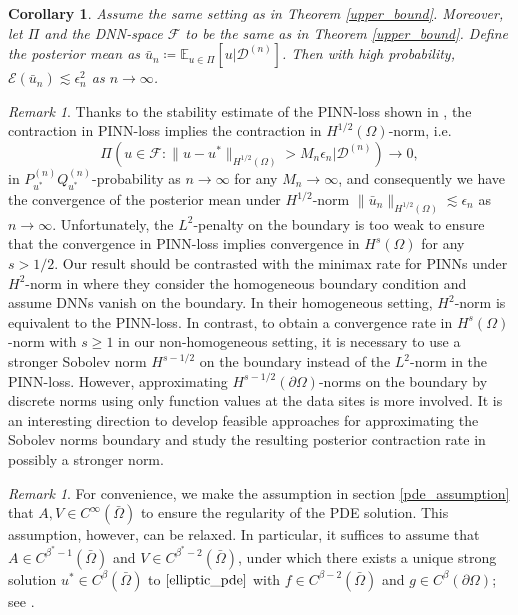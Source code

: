 \documentclass{article}
\newcommand{\E}{\mathbb{E}}
\newcommand{\F}{\mathcal{F}}
\newcommand{\D}{\mathcal{D}}
\theoremstyle{plain}
\newtheorem{corollary}[theorem]{Corollary}
\theoremstyle{definition}
\theoremstyle{remark}
\newtheorem{remark}[theorem]{Remark}
\begin{document}
\begin{corollary} \label{upper_bound_posterior_mean}
    Assume the same setting as in Theorem \ref{upper_bound}. Moreover, let $\Pi$ and the DNN-space $\F$ to be the same as in Theorem \ref{upper_bound}. Define the posterior mean as $\bar{u}_n \coloneqq \E_{u \in \Pi} \left[u | \D^{(n)}\right]$. Then with high probability,  $\mathcal{E}(\bar{u}_n)  \lesssim \epsilon_n^2$ as $n \rightarrow \infty$. 
    
\end{corollary}

\begin{remark} \label{rem:boundary}
    Thanks to the stability estimate of the PINN-loss shown in  \citep[Theorem 8]{zeinhofer2022notes}, the contraction in PINN-loss implies the contraction in $H^{1/2}(\Omega)$-norm, i.e.
    \begin{equation*}
         \Pi(u \in \F: \|u-u^*\|_{H^{1/2}(\Omega)} > M_n \epsilon_n | \D^{(n)}) \to 0,
     \end{equation*}
     in $P_{u^*}^{(n)} Q_{u^*}^{(n)}$-probability as $n \to \infty$ for any $M_n \to \infty$, and consequently we have the convergence of the posterior mean under $H^{1/2}$-norm $\|\bar{u}_n\|_{H^{1/2}(\Omega)} \lesssim \epsilon_n$ as $n\rightarrow \infty$.  Unfortunately,  the $L^2$-penalty on the boundary is too weak to ensure that the convergence in PINN-loss implies convergence in $H^{s}(\Omega)$ for any $s > {1/2}$. Our result should be contrasted with the minimax rate for PINNs under $H^2$-norm in \cite{lu2021machine} where they consider the homogeneous boundary condition and assume DNNs vanish on the boundary. In their homogeneous setting, $H^2$-norm is equivalent to the PINN-loss. In contrast, 
     to obtain a convergence  rate in $H^s(\Omega)$-norm with $s\geq 1$ in our non-homogeneous setting, it is necessary to use a stronger  Sobolev norm $H^{s-1/2}$ on the boundary instead of the $L^2$-norm in the PINN-loss. However, approximating  $H^{s-1/2} (\partial \Omega)$-norms on the boundary by discrete norms  using only function values 
at the data sites is more involved. It is an interesting direction to develop feasible approaches for approximating the Sobolev norms boundary and study the resulting posterior contraction rate in possibly a stronger norm. 

\end{remark}

\begin{remark}
    For convenience, we make the assumption in section \ref{pde_assumption} that $A, V \in C^\infty(\bar{\Omega})$ to ensure the regularity of the PDE solution. This assumption, however, can be relaxed. In particular, it suffices to assume that $A \in C^{\beta^*-1}(\bar{\Omega})$ and $V \in C^{\beta^*-2}(\bar{\Omega})$, under which there exists a unique strong solution $u^* \in C^\beta(\bar{\Omega})$ to $\eqref{elliptic_pde}$ with $f \in C^{\beta-2}(\bar{\Omega})$ and $g \in C^\beta(\partial{\Omega})$; see \cite{grisvard2011elliptic}.
\end{remark}
\end{document}

